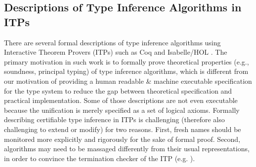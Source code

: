 \subsection{Descriptions of Type Inference Algorithms in ITPs}
There are several formal descriptions of type inference algorithms using
Interactive Theorem Provers (ITPs) such as Coq \cite{Dubois00} and
Isabelle/HOL \cite{UrbanN2009}. The primary motivation %
in such work is to formally prove theoretical properties (e.g., soundness,
principal typing) of type inference algorithms, which is different from
our motivation of providing a human readable \& machine executable
specification for the type system to reduce the gap between
theoretical specification and practical implementation. Some of those
descriptions  are not even executable because the unification is merely
specified as a set of logical axioms.
Formally describing certifiable type inference in ITPs is challenging
(therefore also challenging to extend or modify) for two reasons. First, fresh
names should be monitored more explicitly and rigorously for the sake of
formal proof. Second, algorithms may need to be massaged differently from
their usual representations, in order to convince the termination checker of
the ITP (e.g. \cite{JFP:185139}).

